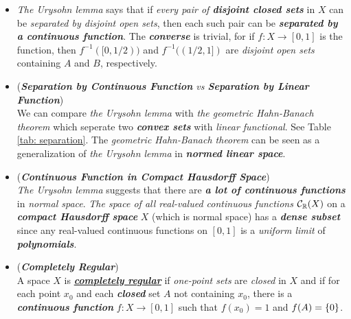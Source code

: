 \documentclass[11pt]{article}
\begin{document}
\begin{itemize}
\item \begin{remark}
\emph{The Urysohn lemma} says that if \emph{every pair of \textbf{disjoint closed sets}} in $X$ can be \emph{separated by disjoint open sets}, then each such pair can be \emph{\textbf{separated by a continuous function}}. The \emph{\textbf{converse}} is trivial, for if $f : X \rightarrow [0, 1]$ is the function, then $f^{-1}([0, 1/2))$ and $f^{-1}((1/2, 1])$ are \emph{disjoint open sets} containing $A$ and $B$, respectively.
\end{remark}

\item \begin{remark} (\emph{\textbf{Separation by Continuous Function} vs \textbf{Separation by Linear Function}})\\
We can compare \emph{the Urysohn lemma} with \emph{the geometric Hahn-Banach theorem} which seperate two \emph{\textbf{convex sets}} with \emph{linear functional}. See Table \ref{tab: separation}. The \emph{geometric Hahn-Banach theorem} can be seen as a generalization of \emph{the Urysohn lemma} in \emph{\textbf{normed linear space}}.
\end{remark}

\item \begin{remark} (\emph{\textbf{Continuous Function in Compact Hausdorff Space}}) \citep{reed1980methods} \\
\emph{The Urysohn lemma} suggests that there are \emph{\textbf{a lot of continuous functions}} in \emph{normal space}.  \emph{The space of all real-valued continuous functions} ${\mathcal C}_{{\mathbb R}}(X)$ on a \emph{\textbf{compact Hausdorff space}} $X$ (which is normal space) has a \emph{\textbf{dense subset}} since any real-valued continuous functions on $[0,1]$ is a \emph{uniform limit} of \emph{\textbf{polynomials}}.  
\end{remark}


\item \begin{definition} (\emph{\textbf{Completely Regular}})\\
A space $X$ is \emph{\textbf{\underline{completely regular}}} if \emph{one-point sets} are \emph{closed} in $X$ and if for each point $x_0$ and each \emph{\textbf{closed}} set $A$ not containing $x_0$, there is a \emph{\textbf{continuous function}} $f : X \rightarrow [0, 1]$ such that $f(x_0) = 1$ and $f(A) = \left\{0\right\}$.
\end{definition}


\end{itemize}
\end{document}
